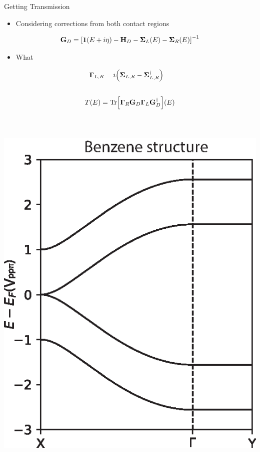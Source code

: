 \documentclass[hyperref={colorlinks=true,urlcolor=blue,linkcolor=.},aspectratio=1610,mathserif]{beamer}
\newcommand{\im}[3]{\inputminted[linenos=true, python3=true, firstline=#2, lastline=#3]{python}{#1}}
\begin{document}
\begin{frame}{Getting Transmission}
	\centering
	\begin{overprint}
		\begin{itemize}
		    \item Considering corrections from both contact regions
		\end{itemize}
		\begin{align*}
			\vb{G}_D  = \bqty{\vb{1}\pqty{E+i\eta}-\vb{H}_D - \vb{\Sigma}_L(E)-\vb{\Sigma}_R(E)}^{-1}
		\end{align*}
		\begin{itemize}
		    \item What 
		\end{itemize}
		\begin{align*}
		    \vb{\Gamma}_{L,R} & = i\pqty{\vb{\Sigma}_{L,R} - \vb{\Sigma}_{L,R}^{\dagger}}
		\end{align*}
		\im{Listings/Functions.py}{225}{228}
		\begin{align*}
			T(E) = \mathrm{Tr}\bqty{\vb{\Gamma}_R\vb{G}_D\vb{\Gamma}_L\vb{G}_D^{\dagger}}(E)
		\end{align*}
		\begin{columns}[c]
			\im{Listings/Functions.py}{240}{243}
		\end{columns}
		\vspace{-.5cm}
		\begin{columns}[c]
			\includegraphics[width=.75\textwidth]{Figures/Beta1.eps}

\end{columns}
\end{overprint}
\end{frame}
\end{document}
